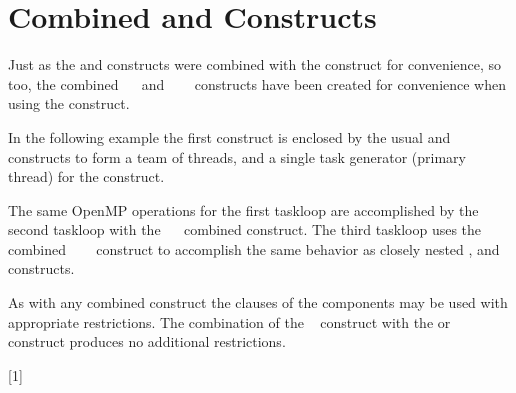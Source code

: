 \pagebreak
\section{Combined   and  Constructs}
\label{sec:parallel_masked_taskloop}

Just as the  and  constructs were combined
with the  construct for convenience, so too, the combined
~~ and 
~~~
constructs have been created for convenience when using the
 construct.
  
In the following example the first  construct is enclosed
by the usual  and  constructs to form
a team of threads, and a single task generator (primary thread) for
the  construct.

The same OpenMP operations for the first taskloop are accomplished by the second
taskloop with the ~~ 
combined construct. 
The third taskloop uses the combined ~~~ 
construct to accomplish the same behavior as closely nested ,
and  constructs.

As with any combined construct the clauses of the components may be used
with appropriate restrictions. The combination of the ~ construct
with the  or ~ construct produces no additional 
restrictions.


[1]
